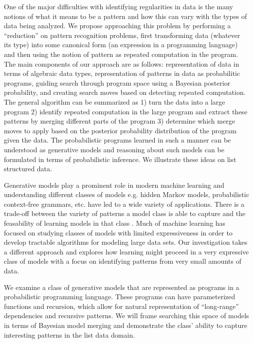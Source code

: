 \documentclass[a4paper,10pt]{article}
\begin{document}
One of the major difficulties with identifying regularities in data is the many notions of what it means to be a pattern and how this can vary with the types of data being analyzed.   We propose approaching this problem by performing a ``reduction'' on pattern recognition problems, first transforming data (whatever its type) into some canonical form (an expression in a programming language) and then using the notion of pattern as repeated computation in the program.  The main components of our approach are as follows: representation of data in terms of algebraic data types, representation of patterns in data as probabilitic programs, guiding search through program space using a Bayesian posterior probability, and creating search moves based on detecting repeated computation.  The general algorithm can be summarized as 1) turn the data into a large program 2) identify repeated computation in the large program and extract these patterns by merging different parts of the program 3) determine which merge moves to apply based on the posterior probability distribution of the program given the data.  The probabilistic programs learned in such a manner can be understood as generative models and reasoning about such models can be formulated in terms of probabilistic inference.  We illustrate these ideas on list structured data.  

Generative models play a prominent role in modern machine learning and understanding different classes of models e.g. hidden Markov models, probabilistic context-free grammars, etc. have led to a wide variety of applications.  There is a trade-off between the variety of patterns a model class is able to capture and the feasability of learning models in that class \cite{Russell2003}.  Much of machine learning has focused on studying classes of models with limited expressiveness in order to develop tractable algorithms for modeling large data sets.  Our investigation takes a different approach and explores how learning might proceed in a very expressive class of models with a focus on identifying patterns from very small amounts of data.  

We examine a class of generative models that are represented as programs in a probabilistic programming language.  These programs can have parameterized functions and recursion, which allow for natural representation of ``long-range'' dependencies and recursive patterns.  We will frame searching this space of models in terms of Bayesian model merging \cite{Stolcke:1994:IPG:645515.658235} and demonstrate the class' ability to capture interesting patterns in the list data domain.
\end{document}
